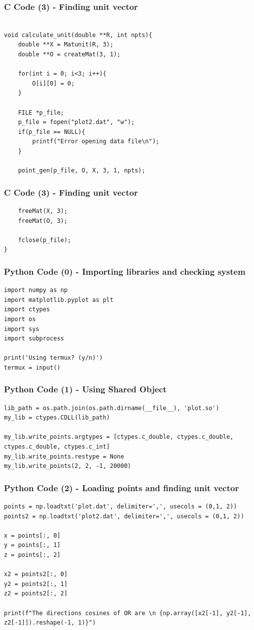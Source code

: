 \documentclass{beamer}
\begin{document}
\begin{frame}[fragile]
    \frametitle{C Code (3) - Finding unit vector}

    \begin{lstlisting}

void calculate_unit(double **R, int npts){
    double **X = Matunit(R, 3);
    double **O = createMat(3, 1);

    for(int i = 0; i<3; i++){
        O[i][0] = 0;
    }

    FILE *p_file;
    p_file = fopen("plot2.dat", "w");
    if(p_file == NULL){
        printf("Error opening data file\n");
    }

    point_gen(p_file, O, X, 3, 1, npts);

    \end{lstlisting}
\end{frame}


\begin{frame}[fragile]
    \frametitle{C Code (3) - Finding unit vector}

    \begin{lstlisting}
    freeMat(X, 3);
    freeMat(O, 3);

    fclose(p_file);
}
\end{lstlisting}
\end{frame}

\begin{frame}[fragile]
    \frametitle{Python Code (0) - Importing libraries and checking system}
    \begin{lstlisting}
import numpy as np
import matplotlib.pyplot as plt
import ctypes
import os
import sys
import subprocess

print('Using termux? (y/n)')
termux = input()
\end{lstlisting}
\end{frame}

\begin{frame}[fragile]
    \frametitle{Python Code (1) - Using Shared Object}
    \begin{lstlisting}
lib_path = os.path.join(os.path.dirname(__file__), 'plot.so')
my_lib = ctypes.CDLL(lib_path)

my_lib.write_points.argtypes = [ctypes.c_double, ctypes.c_double, ctypes.c_double, ctypes.c_int]
my_lib.write_points.restype = None
my_lib.write_points(2, 2, -1, 20000)
\end{lstlisting}
\end{frame}

\begin{frame}[fragile]
    \frametitle{Python Code (2) - Loading points and finding unit vector}
    \begin{lstlisting}
points = np.loadtxt('plot.dat', delimiter=',', usecols = (0,1, 2))
points2 = np.loadtxt('plot2.dat', delimiter=',', usecols = (0,1, 2))

x = points[:, 0]
y = points[:, 1]
z = points[:, 2]

x2 = points2[:, 0]
y2 = points2[:, 1]
z2 = points2[:, 2]

print(f"The directions cosines of OR are \n {np.array([x2[-1], y2[-1], z2[-1]]).reshape(-1, 1)}")
\end{lstlisting}
\end{frame}
\end{document}
